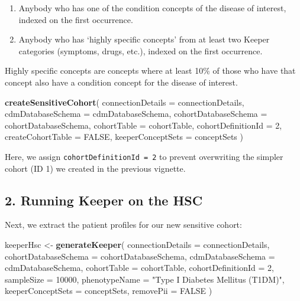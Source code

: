 \documentclass[
]{article}
\newenvironment{Shaded}{\begin{snugshade}}{\end{snugshade}}
\newcommand{\AttributeTok}[1]{\textcolor[rgb]{0.13,0.29,0.53}{#1}}
\newcommand{\ConstantTok}[1]{\textcolor[rgb]{0.56,0.35,0.01}{#1}}
\newcommand{\DecValTok}[1]{\textcolor[rgb]{0.00,0.00,0.81}{#1}}
\newcommand{\FunctionTok}[1]{\textcolor[rgb]{0.13,0.29,0.53}{\textbf{#1}}}
\newcommand{\NormalTok}[1]{#1}
\newcommand{\OtherTok}[1]{\textcolor[rgb]{0.56,0.35,0.01}{#1}}
\newcommand{\StringTok}[1]{\textcolor[rgb]{0.31,0.60,0.02}{#1}}
\begin{document}
\begin{enumerate}
\def\labelenumi{\arabic{enumi}.}
\item
  Anybody who has one of the condition concepts of the disease of
  interest, indexed on the first occurrence.
\item
  Anybody who has `highly specific concepts' from at least two Keeper
  categories (symptoms, drugs, etc.), indexed on the first occurrence.
\end{enumerate}

Highly specific concepts are concepts where at least 10\% of those who
have that concept also have a condition concept for the disease of
interest.

\begin{Shaded}
\begin{Highlighting}[]
\FunctionTok{createSensitiveCohort}\NormalTok{(}
  \AttributeTok{connectionDetails =}\NormalTok{ connectionDetails,}
  \AttributeTok{cdmDatabaseSchema =}\NormalTok{ cdmDatabaseSchema,}
  \AttributeTok{cohortDatabaseSchema =}\NormalTok{ cohortDatabaseSchema,}
  \AttributeTok{cohortTable =}\NormalTok{ cohortTable,}
  \AttributeTok{cohortDefinitionId =} \DecValTok{2}\NormalTok{,}
  \AttributeTok{createCohortTable =} \ConstantTok{FALSE}\NormalTok{,}
  \AttributeTok{keeperConceptSets =}\NormalTok{ conceptSets}
\NormalTok{)}
\end{Highlighting}
\end{Shaded}

Here, we assign \texttt{cohortDefinitionId\ =\ 2} to prevent overwriting
the simpler cohort (ID 1) we created in the previous vignette.

\subsection{2. Running Keeper on the
HSC}\label{running-keeper-on-the-hsc}

Next, we extract the patient profiles for our new sensitive cohort:

\begin{Shaded}
\begin{Highlighting}[]
\NormalTok{keeperHsc }\OtherTok{\textless{}{-}} \FunctionTok{generateKeeper}\NormalTok{(}
  \AttributeTok{connectionDetails =}\NormalTok{ connectionDetails,}
  \AttributeTok{cohortDatabaseSchema =}\NormalTok{ cohortDatabaseSchema,}
  \AttributeTok{cdmDatabaseSchema =}\NormalTok{ cdmDatabaseSchema,}
  \AttributeTok{cohortTable =}\NormalTok{ cohortTable,}
  \AttributeTok{cohortDefinitionId =} \DecValTok{2}\NormalTok{,}
  \AttributeTok{sampleSize =} \DecValTok{10000}\NormalTok{,}
  \AttributeTok{phenotypeName =} \StringTok{"Type I Diabetes Mellitus (T1DM)"}\NormalTok{,}
  \AttributeTok{keeperConceptSets =}\NormalTok{ conceptSets,}
  \AttributeTok{removePii =} \ConstantTok{FALSE}
\NormalTok{)}
\end{Highlighting}
\end{Shaded}
\end{document}
